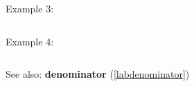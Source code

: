 \noindent Example 3: 
\begin{center}\begin{minipage}{15cm}\begin{Verbatim}[frame=single]
\end{Verbatim}
\end{minipage}\end{center}
\noindent Example 4: 
\begin{center}\begin{minipage}{15cm}\begin{Verbatim}[frame=single]
\end{Verbatim}
\end{minipage}\end{center}
See also: \textbf{denominator} (\ref{labdenominator})
